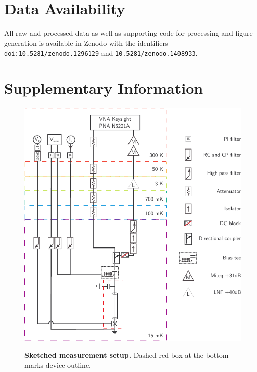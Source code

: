 \section*{Data Availability}
All raw and processed data as well as supporting code for processing and figure generation is available in Zenodo with the identifiers \verb|doi:10.5281/zenodo.1296129|\cite{schmidtDataCodeBallistic2018} and \verb|10.5281/zenodo.1408933|\cite{jenkinsMeasurementAnalysisScripts2018}.

\newpage

\section{Supplementary Information}

\begin{figure}[]
	{\centering
		\includegraphics[width=.8\linewidth]{chapter-gJJ/figs/full_setup_cmyk}}
	\caption{{\bf Sketched measurement setup.}
		Dashed red box at the bottom marks device outline.
	}
	\label{fig:setup_full}
\end{figure}

